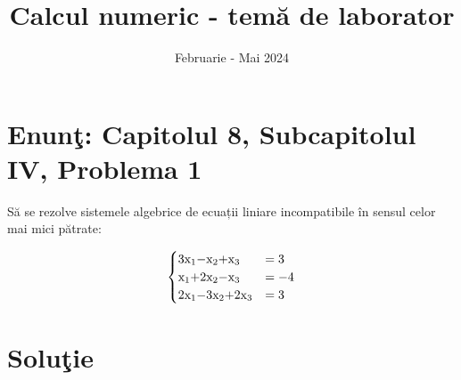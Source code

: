 \documentclass{article}
\begin{document}
\title{Calcul numeric - tem\u{a} de laborator}

\author{}

\date{Februarie - Mai 2024}

\maketitle              %








\section*{Enun\c{t}: Capitolul 8, Subcapitolul IV, Problema 1}

S\u{a} se rezolve sistemele algebrice de ecuații liniare incompatibile în sensul
celor mai mici pătrate:
\begin{center}
\begin{align*}
\begin{cases}
3$x\textsubscript{1}$ - $x\textsubscript{2}$ + $x\textsubscript{3}$ &= 3 \\
$x\textsubscript{1}$ + 2$x\textsubscript{2}$ - $x\textsubscript{3}$ &= -4 \\
2$x\textsubscript{1}$ - 3$x\textsubscript{2}$ + 2$x\textsubscript{3}$ &= 3 \\
 \end{cases}
\end{align*}
\end{center}

\section*{Solu\c{t}ie}
\end{document}
